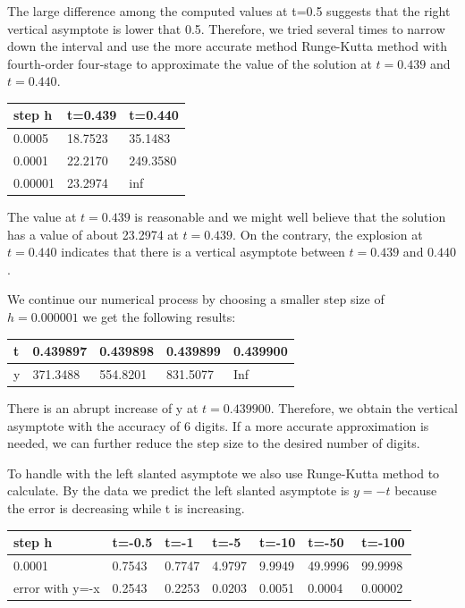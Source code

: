 \documentclass[11pt,a4paper]{article}
\begin{document}
The large difference among the computed values at t=0.5 suggests that the right vertical asymptote is lower that 0.5. Therefore, we tried several times to narrow down the interval and use the more accurate method Runge-Kutta method with fourth-order four-stage to approximate the value of the solution at $t=0.439$ and $t=0.440$.

\begin{table}[H]
	\begin{center}
		\scriptsize
		\renewcommand{\arraystretch}{1.2}
		\begin{tabular}{l|l|l}
			step h  & t=0.439 & t=0.440  \\
			\hline
			0.0005  & 18.7523 & 35.1483  \\
			\hline
			0.0001  & 22.2170 & 249.3580 \\
			\hline
			0.00001 & 23.2974 & inf     
		\end{tabular}
	\end{center}
\end{table}

The value at $t=0.439$ is reasonable and we might well believe that the solution has a value of about 23.2974 at $t=0.439$. On the contrary, the explosion at $t=0.440$ indicates that there is a vertical asymptote between $t=0.439$ and $0.440$. 

We continue our numerical process by choosing a smaller step size of $h=0.000001$ we get the following results: 

\begin{table}[H]
	\centering
	\begin{tabular}{l|l|l|l|l}
	t & 0.439897 & 0.439898 & 0.439899 & 0.439900 \\
	\hline
	y & 371.3488 & 554.8201 & 831.5077 & Inf
	\end{tabular}
\end{table}

There is an abrupt increase of y at $t=0.439900$. Therefore, we obtain the vertical asymptote with the accuracy of 6 digits. If a more accurate approximation is needed, we can further reduce the step size to the desired number of digits. 

To handle with the left slanted asymptote we also use Runge-Kutta method to calculate. By the data we predict the left slanted asymptote is $y=-t$ because the error is decreasing while t is increasing.

\begin{table}[H]
	\centering
	\begin{tabular}{l|l|l|l|l|l|l}
		step h          & t=-0.5 & t=-1   & t=-5   & t=-10  & t=-50   & t=-100  \\ \hline
		0.0001          & 0.7543 & 0.7747 & 4.9797 & 9.9949 & 49.9996 & 99.9998 \\ \hline
		error with y=-x & 0.2543 & 0.2253 & 0.0203 & 0.0051 & 0.0004  & 0.00002 
	\end{tabular}
\end{table}
\end{document}
